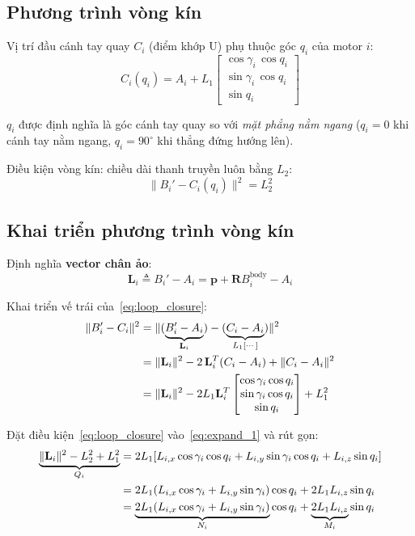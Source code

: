 \documentclass[12pt,a4paper]{article}
\newcommand{\R}{\mathbf{R}}
\newcommand{\pp}{\mathbf{p}}
\newcommand{\Lvec}{\mathbf{L}}
\begin{document}
\subsection{Phương trình vòng kín}

Vị trí đầu cánh tay quay $C_i$ (điểm khớp U) phụ thuộc góc $q_i$ của motor $i$:
\begin{equation}
  C_i(q_i) = A_i + L_1 \begin{bmatrix}
    \cos\gamma_i\,\cos q_i \\ \sin\gamma_i\,\cos q_i \\ \sin q_i
  \end{bmatrix}
  \label{eq:Ci}
\end{equation}

$q_i$ được định nghĩa là góc cánh tay quay so với \textit{mặt phẳng nằm ngang}
($q_i=0$ khi cánh tay nằm ngang, $q_i=90^{\circ}$ khi thẳng đứng hướng lên).

Điều kiện vòng kín: chiều dài thanh truyền luôn bằng $L_2$:
\begin{equation}
  \|B_i' - C_i(q_i)\|^2 = L_2^2
  \label{eq:loop_closure}
\end{equation}

\subsection{Khai triển phương trình vòng kín}

Định nghĩa \textbf{vector chân ảo}:
\begin{equation}
  \Lvec_i \triangleq B_i' - A_i = \pp + \R B_i^{\text{body}} - A_i
  \label{eq:Lvec}
\end{equation}

Khai triển vế trái của~\eqref{eq:loop_closure}:
\begin{align}
  \|B_i' - C_i\|^2
  &= \|(\underbrace{B_i' - A_i}_{\Lvec_i}) - (\underbrace{C_i - A_i}_{L_1[\cdots]})\|^2 \notag\\
  &= \|\Lvec_i\|^2
     - 2\,\Lvec_i^T (C_i - A_i)
     + \|C_i - A_i\|^2 \notag\\
  &= \|\Lvec_i\|^2
     - 2L_1\Lvec_i^T\begin{bmatrix}\cos\gamma_i\cos q_i\\\sin\gamma_i\cos q_i\\\sin q_i\end{bmatrix}
     + L_1^2 \label{eq:expand_1}
\end{align}

Đặt điều kiện~\eqref{eq:loop_closure} vào~\eqref{eq:expand_1} và rút gọn:
\begin{align}
  \underbrace{\|\Lvec_i\|^2 - L_2^2 + L_1^2}_{Q_i}
  &= 2L_1\!\left[L_{i,x}\cos\gamma_i\cos q_i + L_{i,y}\sin\gamma_i\cos q_i + L_{i,z}\sin q_i\right]\notag\\
  &= 2L_1(L_{i,x}\cos\gamma_i + L_{i,y}\sin\gamma_i)\cos q_i + 2L_1 L_{i,z}\sin q_i\notag\\
  &= \underbrace{2L_1(L_{i,x}\cos\gamma_i + L_{i,y}\sin\gamma_i)}_{N_i}\cos q_i
   + \underbrace{2L_1 L_{i,z}}_{M_i}\sin q_i
\end{align}
\end{document}
